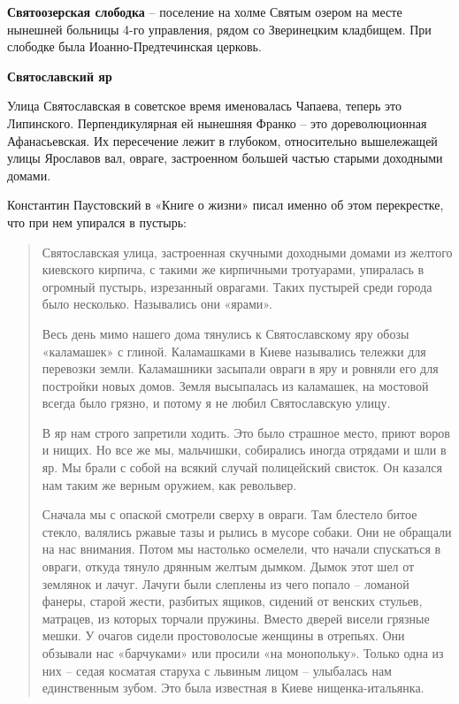 \medskip

\textbf{Святоозерская слободка} – поселение на холме Святым озером на месте нынешней больницы 4-го управления, рядом со Зверинецким кладбищем. При слободке была Иоанно-Пред\-течинская церковь.\\

\medskip

\textbf{Святославский яр}

Улица Святославская в советское время именовалась Чапаева, теперь это Липинского. Перпендикулярная ей нынешняя Франко – это дореволюционная Афанасьевская. Их пересечение лежит в глубоком, относительно вышележащей улицы Ярославов вал, овраге, застроенном большей частью старыми доходными домами.

Константин Паустовский в «Книге о жизни» писал именно об этом перекрестке, что при нем упирался в пустырь:

\begin{quotation}
Святославская улица, застроенная скучными доходными домами из желтого киевского кирпича, с такими же кирпичными тротуарами, упиралась в огромный пустырь, изрезанный оврагами. Таких пустырей среди города было несколько. Назывались они «ярами».

Весь день мимо нашего дома тянулись к Святославскому яру обозы «каламашек» с глиной. Каламашками в Киеве назывались тележки для перевозки земли. Каламашники засыпали овраги в яру и ровняли его для постройки новых домов. Земля высыпалась из каламашек, на мостовой всегда было грязно, и потому я не любил Святославскую улицу.

В яр нам строго запретили ходить. Это было страшное место, приют воров и нищих. Но все же мы, мальчишки, собирались иногда отрядами и шли в яр. Мы брали с собой на всякий случай полицейский свисток. Он казался нам таким же верным оружием, как револьвер.

Сначала мы с опаской смотрели сверху в овраги. Там блестело битое стекло, валялись ржавые тазы и рылись в мусоре собаки. Они не обращали на нас внимания. Потом мы настолько осмелели, что начали спускаться в овраги, откуда тянуло дрянным желтым дымком. Дымок этот шел от землянок и лачуг. Лачуги были слеплены из чего попало – ломаной фанеры, старой жести, разбитых ящиков, сидений от венских стульев, матрацев, из которых торчали пружины. Вместо дверей висели грязные мешки. У очагов сидели простоволосые женщины в отрепьях. Они обзывали нас «барчуками» или просили «на монопольку». Только одна из них – седая косматая старуха с львиным лицом – улыбалась нам единственным зубом. Это была известная в Киеве нищенка-итальянка.
\end{quotation}

